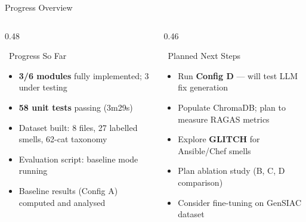\documentclass[aspectratio=169, 10pt]{beamer}
\newcommand{\faShieldAlt}{\faPreselectedIcon{shield-alt}}
\begin{document}
\begin{frame}[shrink=5]{Progress Overview}
  \begin{center}
  \end{center}
  \vspace{0.3em}
  \begin{columns}[T]
    \begin{column}{0.48\textwidth}
      \begin{exampleblock}{\faCheckSquare\ Progress So Far}
        \begin{itemize}
          \item \textbf{3/6 modules} fully implemented; 3 under testing
          \item \textbf{58 unit tests} passing (3m29s)
          \item Dataset built: 8 files, 27 labelled smells, 62-cat taxonomy
          \item Evaluation script: baseline mode running
          \item Baseline results (Config A) computed and analysed
        \end{itemize}
      \end{exampleblock}
    \end{column}
    \begin{column}{0.46\textwidth}
      \begin{alertblock}{\faHourglassHalf\ Planned Next Steps}
        \begin{itemize}
          \item Run \textbf{Config D} --- will test LLM fix generation
          \item Populate ChromaDB; plan to measure RAGAS metrics
          \item Explore \textbf{GLITCH} for Ansible/Chef smells
          \item Plan ablation study (B, C, D comparison)
          \item Consider fine-tuning on GenSIAC dataset
        \end{itemize}
      \end{alertblock}
    \end{column}
  \end{columns}
\end{frame}
\end{document}
